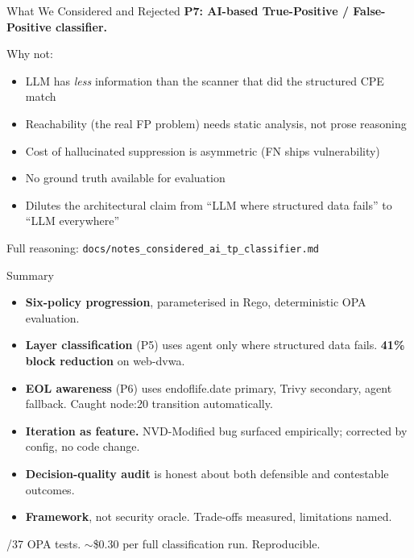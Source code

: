 \documentclass[aspectratio=169]{beamer}
\begin{document}
\begin{frame}{What We Considered and Rejected}
\textbf{P7: AI-based True-Positive / False-Positive classifier.}

\medskip
Why not:
\begin{itemize}
  \item LLM has \emph{less} information than the scanner that did the structured CPE match
  \item Reachability (the real FP problem) needs static analysis, not prose reasoning
  \item Cost of hallucinated suppression is asymmetric (FN ships vulnerability)
  \item No ground truth available for evaluation
  \item Dilutes the architectural claim from ``LLM where structured data fails'' to ``LLM everywhere''
\end{itemize}

\medskip
Full reasoning: \texttt{docs/notes\_considered\_ai\_tp\_classifier.md}
\end{frame}

\begin{frame}{Summary}
\begin{itemize}
  \item \textbf{Six-policy progression}, parameterised in Rego, deterministic OPA evaluation.

  \item \textbf{Layer classification} (P5) uses agent only where structured data fails. \textbf{41\% block reduction} on web-dvwa.

  \item \textbf{EOL awareness} (P6) uses endoflife.date primary, Trivy secondary, agent fallback. Caught node:20 transition automatically.

  \item \textbf{Iteration as feature.} NVD-Modified bug surfaced empirically; corrected by config, no code change.

  \item \textbf{Decision-quality audit} is honest about both defensible and contestable outcomes.

  \item \textbf{Framework}, not security oracle. Trade-offs measured, limitations named.
\end{itemize}

/37 OPA tests. $\sim$\$0.30 per full classification run. Reproducible.
\end{frame}
\end{document}
